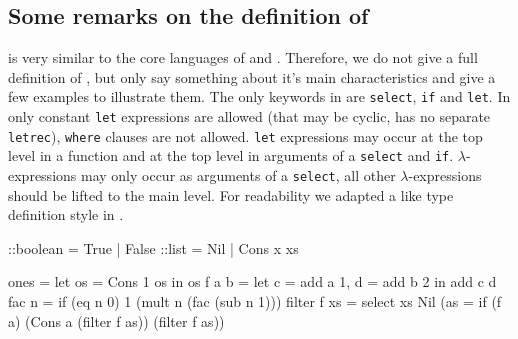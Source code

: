 \subsection{Some remarks on the definition of \Sapl}
\Sapl is very similar to the core languages of \Haskell and \Clean. 
Therefore, we do not give a full definition of \Sapl, but only say something about it's main characteristics
and give a few examples to illustrate them.
The only keywords in \Sapl are \texttt{select}, \texttt{if} and \texttt{let}.
In \Sapl only constant \texttt{let} expressions are allowed 
(that may be cyclic, \Sapl has no separate \texttt{letrec}), \texttt{where} clauses are not allowed.
\texttt{let} expressions may occur at the top level in a function and at the top level in  arguments of a  \texttt{select} and \texttt{if}.
$\lambda$-expressions may only occur as arguments of a \texttt{select}, all other $\lambda$-expressions should be lifted to the main
level. 
For readability we adapted a \Clean like type definition style in \Sapl. 
\begin{CleanCode}
::boolean   = True | False
::list      = Nil  | Cons x xs

ones        = let os = Cons 1 os in os 
f a b       = let c = add a 1, d = add b 2 in add c d
fac n       = if (eq n 0) 1 (mult n (fac (sub n 1)))
filter f xs = select xs Nil (\a as = if (f a) (Cons a (filter f as)) (filter f as))
\end{CleanCode}





